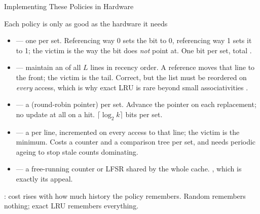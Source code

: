 \documentclass[aspectratio=169]{beamer}
\begin{document}
\begin{frame}{Implementing These Policies in Hardware}
  \scriptsize
  \begin{block}{Each policy is only as good as the hardware it needs}
    \begin{itemize}
      \item {} --- one  per set.
        Referencing way 0 sets the bit to 0, referencing way 1 sets it to 1;
        the victim is the way the bit does \emph{not} point at. One bit per
        set, total \cite[\S5.2, PDF p.~203]{Stallings2015_computer_organization}.
      \item {} --- maintain an  of
        all $L$ lines in recency order. A reference moves that line to the
        front; the victim is the tail. Correct, but the list must be reordered
        on \emph{every} access, which is why exact LRU is rare beyond small
        associativities
        \cite[\S5.2, PDF p.~203]{Stallings2015_computer_organization}.
      \item {} --- a  (round-robin pointer) per
        set. Advance the pointer on each replacement; no update at all on a
        hit. $\lceil \log_2 k \rceil$ bits per set.
      \item {} --- a  per line, incremented on
        every access to that line; the victim is the minimum. Costs a counter
        and a comparison tree per set, and needs periodic ageing to stop stale
        counts dominating.
      \item {} --- a free-running counter or LFSR shared by the whole
        cache. , which is exactly its appeal.
    \end{itemize}
  \end{block}
  : cost rises with how much history the policy remembers.
  Random remembers nothing; exact LRU remembers everything.
\end{frame}
\end{document}
